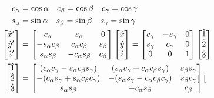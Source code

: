 \documentclass[10pt]{article}
\begin{document}
\begin{align}
    c_\alpha &=\cos\alpha \quad c_\beta=\cos\beta \quad c_\gamma=\cos\gamma 
        \notag\\
    s_\alpha &= \sin\alpha \quad s_\beta=\sin\beta \quad s_\gamma=\sin\gamma 
        \notag\\
    \begin{bmatrix}
        \hat{x}' \\
        \hat{y}' \\
        \hat{z}'
    \end{bmatrix}
    &=
    \begin{bmatrix}
        c_\alpha & s_\alpha & 0 \\
        -s_\alpha c_\beta & c_\alpha c_\beta & s_\beta \\
        s_\alpha s_\beta & -c_\alpha s_\beta & c_\beta
    \end{bmatrix}
    \begin{bmatrix}
        \hat x \\
        \hat y \\
        \hat z
    \end{bmatrix}
    =
    \begin{bmatrix}
        c_\gamma &  -s_\gamma & 0 \\
        s_\gamma & c_\gamma & 0 \\
        0 & 0 & 1
    \end{bmatrix}
    \begin{bmatrix}
        \hat1 \\
        \hat2 \\
        \hat3
    \end{bmatrix}
    \notag\\
    \begin{bmatrix}
        \hat1 \\
        \hat2 \\
        \hat3
    \end{bmatrix}
    &=
    \begin{bmatrix}
        (c_\alpha c_\gamma - s_\alpha c_\beta s_\gamma) &
            (s_\alpha c_\gamma + c_\alpha c_\beta s_\gamma) &
            s_\beta s_\gamma \\
        -(c_\alpha s_\gamma+s_\alpha c_\beta c_\gamma) &
            -(s_\alpha s_\gamma-c_\alpha c_\beta c_\gamma) &
            s_\beta c_\gamma \\ 
        s_\alpha s_\beta & - c_\alpha s_\beta & c_\beta
    \end{bmatrix}
    \begin{bmatrix}

\end{bmatrix}
\end{align}
\end{document}
